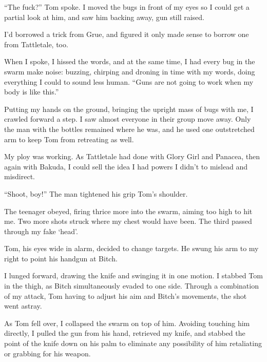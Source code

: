 ``The fuck?'' Tom spoke.  I moved the bugs in front of my eyes so I could get a partial look at him, and saw him backing away, gun still raised.



I'd borrowed a trick from Grue, and figured it only made sense to borrow one from Tattletale, too.



When I spoke, I hissed the words, and at the same time, I had every bug in the swarm make noise: buzzing, chirping and droning in time with my words, doing everything I could to sound less human.  ``Guns are not going to work when my body is like this.''



Putting my hands on the ground, bringing the upright mass of bugs with me, I crawled forward a step.  I saw almost everyone in their group move away.  Only the man with the bottles remained where he was, and he used one outstretched arm to keep Tom from retreating as well.



My ploy was working.  As Tattletale had done with Glory Girl and Panacea, then again with Bakuda, I could sell the idea I had powers I didn't to mislead and misdirect.



``Shoot, boy!''  The man tightened his grip Tom's shoulder.



The teenager obeyed, firing thrice more into the swarm, aiming too high to hit me.  Two more shots struck where my chest would have been.  The third passed through my fake `head'.



Tom, his eyes wide in alarm, decided to change targets.  He swung his arm to my right to point his handgun at Bitch.



I lunged forward, drawing the knife and swinging it in one motion.  I stabbed Tom in the thigh, as Bitch simultaneously evaded to one side.  Through a combination of my attack, Tom having to adjust his aim and Bitch's movements, the shot went astray.



As Tom fell over, I collapsed the swarm on top of him.  Avoiding touching him directly, I pulled the gun from his hand, retrieved my knife, and stabbed the point of the knife down on his palm to eliminate any possibility of him retaliating or grabbing for his weapon.



